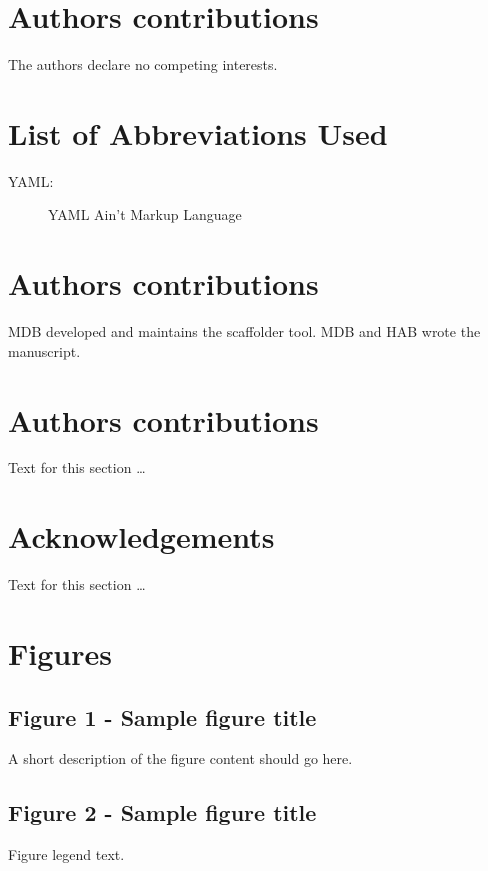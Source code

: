 \documentclass[10pt]{bmc_article}
\newenvironment{bmcformat}{\begin{raggedright}\baselineskip20pt\sloppy\setboolean{publ}{false}}{\end{raggedright}\baselineskip20pt\sloppy}
\begin{document}
\begin{bmcformat}
\section*{Authors contributions}
  The authors declare no competing interests.
\section*{List of Abbreviations Used}

  \begin{description}
    \item[YAML:] YAML Ain't Markup Language\cite{yaml}
  \end{description}

\section*{Authors contributions}

MDB developed and maintains the scaffolder tool. MDB and HAB wrote the
manuscript.

\section*{Authors contributions}
    Text for this section \ldots
\section*{Acknowledgements}
  Text for this section \ldots
{
   }     %

\section*{Figures}
  \subsection*{Figure 1 - Sample figure title}
      A short description of the figure content
      should go here.

  \subsection*{Figure 2 - Sample figure title}
      Figure legend text.

\end{bmcformat}
\end{document}
